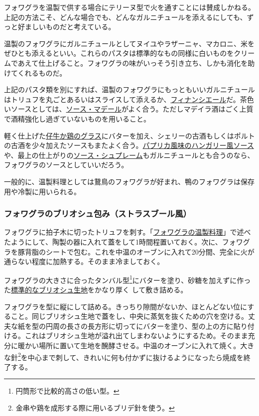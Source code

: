 フォワグラを温製で供する場合にテリーヌ型で火を通すことには賛成しかねる。上記の方法こそ、どんな場合でも、どんなガルニチュールを添えるにしても、ずっと好ましいものだと考えている。

温製のフォワグラにガルニチュールとしてヌイユやラザーニャ、マカロニ、米をぜひとも添えるといい。これらのパスタは標準的なもの同様に白いものをクリームであえて仕上げること。フォワグラの味がいっそう引き立ち、しかも消化を助けてくれるものだ。

上記のパスタ類を別にすれば、温製のフォワグラにもっともいいガルニチュールはトリュフを丸ごとあるいはスライスして添えるか、\protect\hyperlink{garniture-a-la-financiere}{フィナンシエール}だ。茶色いソースとしては、\protect\hyperlink{sauce-madere}{ソース・マデール}がよく合う。ただしマデイラ酒はごく上質で酒精強化し過ぎていないものを用いること。

軽く仕上げた\protect\hyperlink{glaces-diverses}{仔牛か鶏のグラス}にバターを加え、シェリーの古酒もしくはポルトの古酒を少々加えたソースもまたよく合う。\protect\hyperlink{sauce-hongroise}{パプリカ風味のハンガリー風ソース}や、最上の仕上がりの\protect\hyperlink{sauce-supreme}{ソース・シュプレーム}もガルニチュールとも合うのなら、フォワグラのソースとしていいだろう。

一般的に、温製料理としては鵞鳥のフォワグラが好まれ、鴨のフォワグラは保存用や冷製に用いられる。

\hypertarget{foie-gras-cuit-dans-une-brioche}{%
\subsubsection{フォワグラのブリオシュ包み（ストラスブール風）}\label{foie-gras-cuit-dans-une-brioche}}


フォワグラに拍子木に切ったトリュフを刺す。「\protect\hyperlink{preparations-chaudes-du-foie-gras}{フォワグラの温製料理}」で述べたようにして、陶製の器に入れて蓋をして1時間程置いておく。次に、フォワグラを豚背脂のシートで包む。これを中温のオーブンに入れて20分間、完全に火が通らない程度に加熱する。そのまま冷ましておく。

フォワグラの大きさに合ったタンバル型\footnote{円筒形で比較的高さの低い型。}にバターを塗り、砂糖を加えずに作った\protect\hyperlink{pate-a-brioche-commune}{標準的なブリオシュ生地}をかなり厚く
して敷き詰める。

フォワグラを型に縦にして詰める。きっちり隙間がないか、ほとんどない位にすること。同じブリオシュ生地で蓋をし、中央に蒸気を抜くための穴を空ける。丈夫な紙を型の円周の長さの長方形に切ってにバターを塗り、型の上の方に貼り付ける。これはブリオシュ生地が溢れ出てしまわないようにするため。そのまま充分に暖かい場所に置いて生地を醗酵させる。中温のオーブンに入れて焼く。大きな針\footnote{金串や鶏を成形する際に用いるブリデ針を使う。}を中心まで刺して、きれいに何も付かずに抜けるようになったら焼成を終了する。

